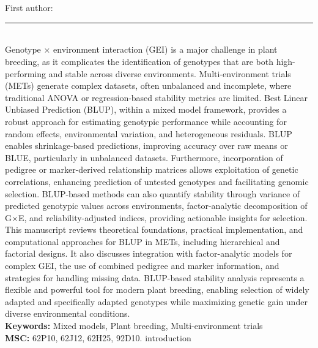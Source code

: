 \documentclass[10pt,twoside]{article}
\begin{document}
\noindent\begin{minipage}[t][\textheight]{\textwidth}
\\[0.35em]
{\itshape }\\[0.2em]
{\footnotesize First author: }\\[0.45em]
\noindent\rule{\textwidth}{0.3pt}\\[0.4em]
{\footnotesize Genotype × environment interaction (GEI) is a major challenge in plant breeding, as it complicates the identification of genotypes that are both high-performing and stable across diverse environments. Multi-environment trials (METs) generate complex datasets, often unbalanced and incomplete, where traditional ANOVA or regression-based stability metrics are limited. Best Linear Unbiased Prediction (BLUP), within a mixed model framework, provides a robust approach for estimating genotypic performance while accounting for random effects, environmental variation, and heterogeneous residuals. BLUP enables shrinkage-based predictions, improving accuracy over raw means or BLUE, particularly in unbalanced datasets. Furthermore, incorporation of pedigree or marker-derived relationship matrices allows exploitation of genetic correlations, enhancing prediction of untested genotypes and facilitating genomic selection. BLUP-based methods can also quantify stability through variance of predicted genotypic values across environments, factor-analytic decomposition of G×E, and reliability-adjusted indices, providing actionable insights for selection. This manuscript reviews theoretical foundations, practical implementation, and computational approaches for BLUP in METs, including hierarchical and factorial designs. It also discusses integration with factor-analytic models for complex GEI, the use of combined pedigree and marker information, and strategies for handling missing data. BLUP-based stability analysis represents a flexible and powerful tool for modern plant breeding, enabling selection of widely adapted and specifically adapted genotypes while maximizing genetic gain under diverse environmental conditions.}\\[0.4em]
{\footnotesize\bfseries Keywords:} {\footnotesize Mixed models, Plant breeding, Multi-environment trials}\\[0.15em]
{\footnotesize\bfseries MSC:} {\footnotesize 62P10, 62J12, 62H25, 92D10. introduction}\\
\vfill
\end{minipage}
\newpage
\end{document}

